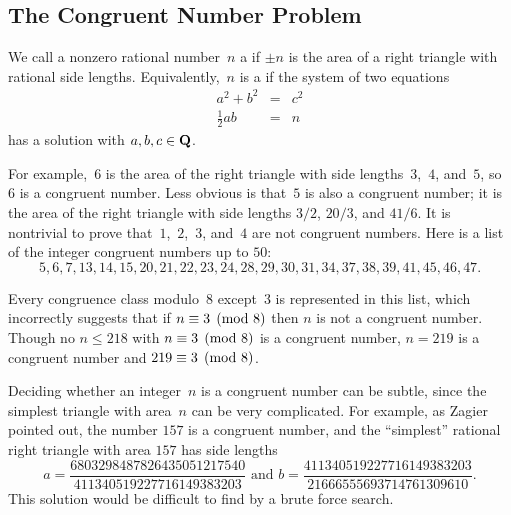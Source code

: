 \subsection{The Congruent Number Problem}\label{sec:congnumprob}
\begin{definition}
We call a nonzero rational number~$n$ a  if
$\pm n$ is the area of a right triangle with rational
side lengths.  Equivalently,~$n$ is a  if the
system of two equations
\begin{eqnarray*}
a^2+b^2&=&c^2\\
\frac{1}{2}ab&=&n
\end{eqnarray*}
has a solution with $a,b,c\in\mathbf{Q}$.
\end{definition}
For example,~$6$ is the area of the right triangle with side lengths~$3$,~$4$,
and~$5$, so~$6$ is a congruent number.
Less obvious is that~$5$
is also a congruent number; it is the area of the right triangle
with side lengths $3/2$, $20/3$,  and $41/6$.  It is nontrivial
to prove that~$1$,~$2$,~$3$, and~$4$ are not congruent numbers.
Here is a list of the integer
congruent numbers
up to $50$:
{
$$
5, 6, 7, 13, 14, 15, 20, 21, 22, 23, 24, 28, 29, 30, 31, 34, 37, 38, 39, 41, 45, 46, 47.
$$
}

Every congruence class modulo~$8$ except~$3$ is represented in this
list, which incorrectly suggests that if $n\equiv 3\pmod{8}$ then $n$ is
not a congruent number.  Though no $n\leq 218$ with $n\equiv 3\pmod{8}$
is a congruent number, $n=219$ is a congruent number and
$219\equiv 3\pmod{8}$.


Deciding whether an integer~$n$ is a congruent number can be subtle,
since the simplest triangle with area~$n$ can be very complicated.
For example, as Zagier pointed out,
the number $157$ is a congruent number, and
the ``simplest'' rational right triangle with area $157$
has side lengths
$$
 a = \frac{6803298487826435051217540}{411340519227716149383203}
\,\, \text{and} \,\,
 b = \frac{411340519227716149383203}{21666555693714761309610}.
$$
This solution would be difficult to find by a brute force search.

